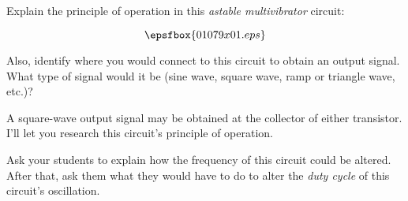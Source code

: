 

Explain the principle of operation in this {\it astable multivibrator} circuit:

$$\epsfbox{01079x01.eps}$$

Also, identify where you would connect to this circuit to obtain an output signal.  What type of signal would it be (sine wave, square wave, ramp or triangle wave, etc.)?







A square-wave output signal may be obtained at the collector of either transistor.  I'll let you research this circuit's principle of operation.







Ask your students to explain how the frequency of this circuit could be altered.  After that, ask them what they would have to do to alter the {\it duty cycle} of this circuit's oscillation.




